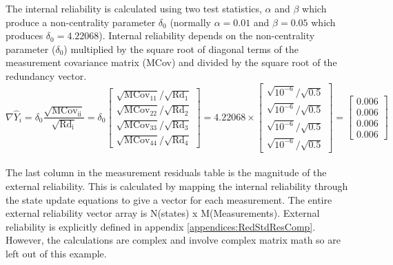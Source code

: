 The internal reliability is calculated using two test statistics, $\alpha$ and $\beta$ which produce a non-centrality parameter $\delta_0$ (normally $\alpha = 0.01$ and $\beta = 0.05$ which produces $\delta_0 = 4.22068$). Internal reliability depends on the non-centrality parameter ($\delta_0$) multiplied by the square root of diagonal terms of the measurement covariance matrix (MCov) and divided by the square root of the redundancy vector.
\begin{equation}
\nabla \hat{Y}_i = \delta_0 \frac{\sqrt{\text{MCov}_\text{ii}}}{\sqrt{\text{Rd}_\text{i}}} = \delta_0 \left[\begin{array}{c}\sqrt{\text{MCov}_{11}}/\sqrt{\text{Rd}_\text{1}}\\\sqrt{\text{MCov}_{22}}/\sqrt{\text{Rd}_\text{2}}\\\sqrt{\text{MCov}_{33}}/\sqrt{\text{Rd}_\text{3}}\\\sqrt{\text{MCov}_{44}}/\sqrt{\text{Rd}_\text{4}}\end{array}\right] = 4.22068 \times \left[\begin{array}{c}\sqrt{10^{-6}}/\sqrt{0.5}\\\sqrt{10^{-6}}/\sqrt{0.5}\\\sqrt{10^{-6}}/\sqrt{0.5}\\\sqrt{10^{-6}}/\sqrt{0.5}\end{array}\right]=\left[\begin{array}{c}0.006\\0.006\\0.006\\0.006\end{array}\right]
\end{equation}
{}\\

The last column in the measurement residuals table is the magnitude of the external reliability. This is calculated by mapping the internal reliability through the state update equations to give a vector for each measurement. The entire external reliability vector array is N(states) x M(Measurements). External reliability is explicitly defined in appendix \ref{appendices:RedStdResComp}. However, the calculations are complex and involve complex matrix math so are left out of this example. 

